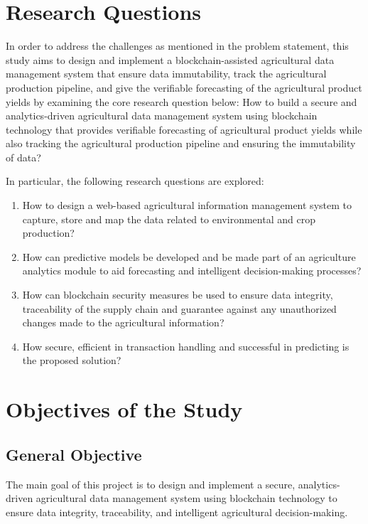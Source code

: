 \section{Research Questions}

In order to address the challenges as mentioned in the problem statement, this study aims to design and implement a blockchain-assisted agricultural data management system that ensure data immutability, track the agricultural production pipeline, and give the verifiable forecasting of the agricultural product yields by examining the core research question below: How to build a secure and analytics-driven agricultural data management system using blockchain technology that provides verifiable forecasting of agricultural product yields while also tracking the agricultural production pipeline and ensuring the immutability of data?

In particular, the following research questions are explored:
\begin{enumerate}[label=(\roman*)]
    \item How to design a web-based agricultural information management system to capture, store and map the data related to environmental and crop production?
    \item How can predictive models be developed and be made part of an agriculture analytics module to aid forecasting and intelligent decision-making processes?
    \item How can blockchain security measures be used to ensure data integrity, traceability of the supply chain and guarantee against any unauthorized changes made to the agricultural information?
    \item How secure, efficient in transaction handling and successful in predicting is the proposed solution?
\end{enumerate}

\section{Objectives of the Study}

\subsection{General Objective}
The main goal of this project is to design and implement a secure, analytics-driven agricultural data management system using blockchain technology to ensure data integrity, traceability, and intelligent agricultural decision-making.

